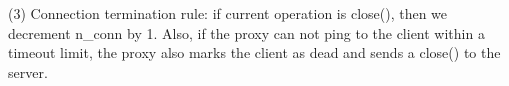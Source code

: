 (3) Connection termination rule: if current \paxos operation is close(), then 
we decrement n\_conn by 1. Also, if 
the proxy can not ping to the client within a timeout limit, the proxy also 
marks the client as dead and sends a close() to the server.




